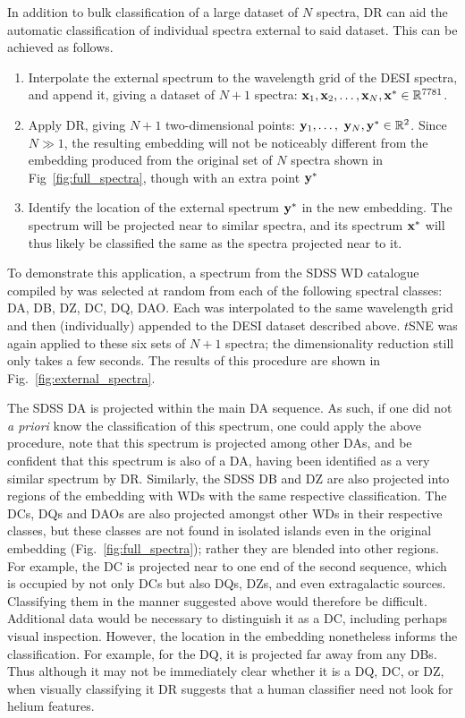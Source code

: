 \documentclass[fleqn,usenatbib]{mnras}
\def\xb{\vb{x}}
\def\yb{\vb{y}}
\begin{document}
In addition to bulk classification of a large dataset of $N$ spectra, DR can aid the automatic classification of individual spectra external to said dataset.
This can be achieved as follows.
\begin{enumerate}
\item
Interpolate the external spectrum to the wavelength grid of the DESI spectra, and append it, giving a dataset of $N+1$ spectra: $\xb_1, \xb_2, \dots, \xb_N, \xb^* \in \mathbb{R}^{7781}$.
\item
Apply DR, giving $N+1$ two-dimensional points: $\yb_1, \dots,$ $\yb_N, \yb^* \in \mathbb{R}^2$.
Since $N\gg1$, the resulting embedding will not be noticeably different from the embedding produced from the original set of $N$ spectra shown in Fig~\ref{fig:full_spectra}, though with an extra point $\yb^*$
\item
Identify the location of the external spectrum $\yb^*$ in the new embedding.
The spectrum will be projected near to similar spectra, and its spectrum $\xb^*$ will thus likely be classified the same as the spectra projected near to it.
\end{enumerate}

To demonstrate this application, a spectrum from the SDSS WD catalogue compiled by \citet{gentilefusillo19} was selected at random from each of the following spectral classes: DA, DB, DZ, DC, DQ, DAO.
Each was interpolated to the same wavelength grid and then (individually) appended to the DESI dataset described above.
$t$SNE was again applied to these six sets of $N+1$ spectra; the dimensionality reduction still only takes a few seconds.
The results of this procedure are shown in Fig.~\ref{fig:external_spectra}.

The SDSS DA is projected within the main DA sequence.
As such, if one did not \textit{a priori} know the classification of this spectrum, one could apply the above procedure, note that this spectrum is projected among other DAs, and be confident that this spectrum is also of a DA, having been identified as a very similar spectrum by DR.
Similarly, the SDSS DB and DZ are also projected into regions of the embedding with WDs with the same respective classification.
The DCs, DQs and DAOs are also projected amongst other WDs in their respective classes, but these classes are not found in isolated islands even in the original embedding (Fig.~\ref{fig:full_spectra}); rather they are blended into other regions.
For example, the DC is projected near to one end of the second sequence, which is occupied by not only DCs but also DQs, DZs, and even extragalactic sources.
Classifying them in the manner suggested above would therefore be difficult.
Additional data would be necessary to distinguish it as a DC, including perhaps visual inspection.
However, the location in the embedding nonetheless informs the classification.
For example, for the DQ, it is projected far away from any DBs.
Thus although it may not be immediately clear whether it is a DQ, DC, or DZ, when visually classifying it DR suggests that a human classifier need not look for helium features.
\end{document}
